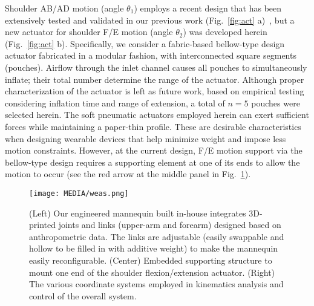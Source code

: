 \documentclass[letterpaper, 10pt, conference]{ieeeconf}      %
\begin{document}
Shoulder AB/AD motion (angle $\theta_1$) employs a recent design that has been extensively tested and validated in our previous work (Fig.~\ref{fig:act} a)~\cite{sahin2022bidirectional}, but a new actuator for shoulder F/E motion (angle $\theta_2$) was developed herein (Fig.~\ref{fig:act} b). 
Specifically, we consider a fabric-based bellow-type design actuator 
fabricated in a modular fashion, with interconnected square segments (pouches). Airflow through the inlet channel causes all pouches to simultaneously inflate; their total number determine the range of the actuator. 
Although proper characterization of the actuator is left as future work, based on empirical testing considering inflation time and range of extension, a total of $n=5$ pouches were selected herein. 
The soft pneumatic actuators employed herein can exert sufficient forces while maintaining a paper-thin profile. 
These are desirable characteristics when designing wearable devices that help minimize weight and impose less motion constraints. 
However, at the current design, F/E motion support via the bellow-type design requires a supporting element at one of its ends to allow the motion to occur (see the red arrow at the middle panel in Fig.~\ref{fig:support}). 



   \begin{figure}[!t]
   \vspace{6pt}
   \centering
     \texttt{[image: MEDIA/weas.png]}
      \vspace{-18pt}
      \caption{(Left) Our engineered mannequin built in-house integrates 3D-printed joints and links (upper-arm and forearm) designed based on anthropometric data. The links are adjustable (easily swappable and hollow to be filled in with additive weight) to make the mannequin easily reconfigurable. 
      (Center) Embedded supporting structure to mount one end of the shoulder flexion/extension actuator. (Right) The various coordinate systems employed in kinematics analysis and control of the overall system.}
      \label{fig:support}
      \vspace{-12pt}
   \end{figure}
\end{document}
